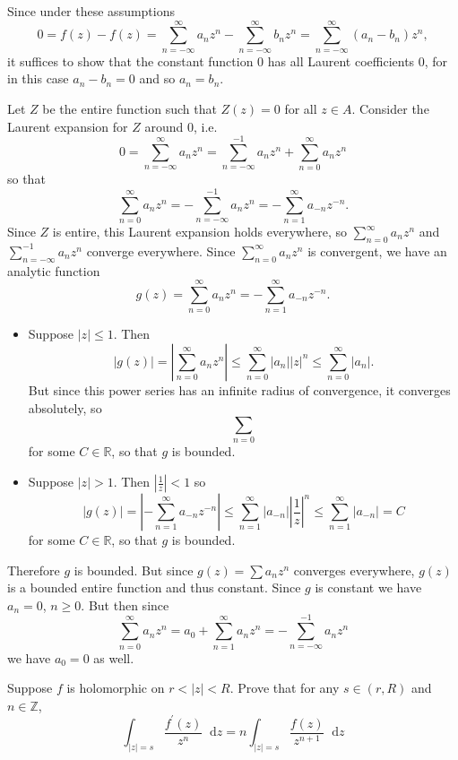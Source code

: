 \documentclass{article}
\newcommand\dif{\mathop{}\!\mathrm{d}}
\newcounter{Problem}
\newenvironment{Problem}{\begin{Exercise}[name={Problem},
                                          counter={Problem}]}
                        {\end{Exercise}}
\begin{document}
\begin{Answer}
Since under these assumptions
$$
  0 
= f(z) - f(z) 
= \sum_{n=-\infty}^\infty a_n z^n - \sum_{n=-\infty}^\infty b_n z^n
= \sum_{n=-\infty}^\infty (a_n - b_n) z^n,
$$
it suffices to show that the constant function 0 has all
Laurent coefficients 0, for in this case $a_n - b_n = 0$ and
so $a_n = b_n$.

Let $Z$ be the entire function such that 
$Z(z) = 0$ for all $z \in A$. Consider the Laurent expansion for $Z$ around 0, i.e.
$$
  0
= \sum_{n=-\infty}^\infty a_n z^n 
= \sum_{n=-\infty}^{-1} a_n z^n
+ \sum_{n=0}^\infty a_n z^n
$$
so that
$$
   \sum_{n=0}^\infty a_n z^n 
= -\sum_{n=-\infty}^{-1} a_n z^n
= -\sum_{n=1}^\infty a_{-n} z^{-n}.
$$
Since $Z$ is entire, this Laurent expansion holds everywhere, so
$\sum_{n=0}^\infty a_n z^n$ and $\sum_{n=-\infty}^{-1} a_n z^n$ converge everywhere.
Since $\sum_{n=0}^\infty a_n z^n$ is convergent, we have an analytic
function
$$
g(z) = \sum_{n=0}^\infty a_n z^n = -\sum_{n=1}^\infty a_{-n} z^{-n}.
$$
\begin{itemize}
  \item{
    Suppose $|z| \leq 1$. Then
    $$
         |g(z)| 
    =    \left|\sum_{n=0}^\infty a_n z^n\right|
    \leq \sum_{n=0}^\infty |a_n| |z|^n
    \leq \sum_{n=0}^\infty |a_n|.
    $$
    But since this power series has an infinite radius of convergence,
    it converges absolutely, so 
    $$
    \sum_{n=0}
    $$
    for some $C \in \mathbb{R}$, so that $g$ is bounded.
  }
  \item{
    Suppose $|z| > 1$. Then $\left|\frac{1}{z}\right| < 1$ so
    $$
         |g(z)|
    =    \left|-\sum_{n=1}^\infty a_{-n} z^{-n}\right|
    \leq \sum_{n=1}^\infty 
           |a_{-n}|
           \left|\frac{1}{z}\right|^n
    \leq \sum_{n=1}^\infty |a_{-n}|
    =    C
    $$
    for some $C \in \mathbb{R}$, so that $g$ is bounded.
  }
\end{itemize}
Therefore $g$ is bounded. But since $g(z) = \sum a_n z^n$ converges everywhere,
$g(z)$ is a bounded entire function and thus constant.
Since $g$ is constant we have $a_n = 0$, $n \geq 0$. But then since
$$
  \sum_{n=0}^\infty a_n z^n 
= a_0 + \sum_{n=1}^\infty a_n z^n
= -\sum_{n=-\infty}^{-1} a_n z^n
$$
we have $a_0 = 0$ as well.
\end{Answer}

\begin{Problem}
Suppose $f$ is holomorphic on $r < |z| < R$. Prove that for any
$s \in (r, R)$ and $n \in \mathbb{Z}$,
$$
   \int_{|z| = s} \frac{f^\prime(z)}{z^n} \dif z
= n\int_{|z| = s} \frac{f(z)}{z^{n+1}} \dif z
$$
\end{Problem}
\end{document}
